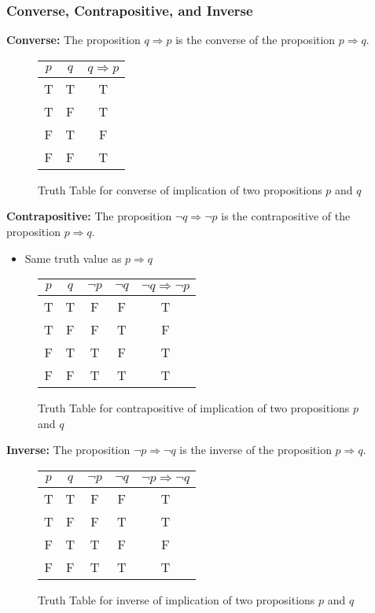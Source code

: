 \documentclass[article, 11pt]{article}
\begin{document}
    \subsubsection{Converse, Contrapositive, and Inverse}
    \textbf{Converse:} The proposition $q \Rightarrow p$ is the converse of the proposition $p \Rightarrow q$. 
    \begin{figure}[H]
        \centering
            \begin{tabular}{c|c|c}
                $p$ & $q$ & $q \Rightarrow p$ \\
                \hline
                T & T & T \\
                T & F & T \\
                F & T & F \\
                F & F & T 
            \end{tabular}   
        \caption{Truth Table for converse of implication of two propositions $p$ and $q$}
    \end{figure}
    \textbf{Contrapositive:} The proposition $\neg q \Rightarrow \neg p$ is the contrapositive of the proposition $p \Rightarrow q$.
    \begin{itemize}
        \item Same truth value as $p \Rightarrow q$
    \end{itemize}
    \begin{figure}[H]
        \centering
            \begin{tabular}{c|c|c|c|c}
                $p$ & $q$ & $\neg{p}$ & $\neg{q}$ & $\neg q \Rightarrow \neg p$ \\
                \hline
                T & T & F & F & T \\
                T & F & F & T & F \\
                F & T & T & F & T \\
                F & F & T & T & T
            \end{tabular}   
        \caption{Truth Table for contrapositive of implication of two propositions $p$ and $q$}
    \end{figure}
    \textbf{Inverse:} The proposition $\neg p \Rightarrow \neg q$ is the inverse of the proposition $p \Rightarrow q$.
    \begin{figure}[H]
        \centering
            \begin{tabular}{c|c|c|c|c}
                $p$ & $q$ & $\neg{p}$ & $\neg{q}$ & $\neg p \Rightarrow \neg q$ \\
                \hline
                T & T & F & F & T \\
                T & F & F & T & T \\
                F & T & T & F & F \\
                F & F & T & T & T
            \end{tabular}    
        \caption{Truth Table for inverse of implication of two propositions $p$ and $q$}
    \end{figure}
\end{document}
